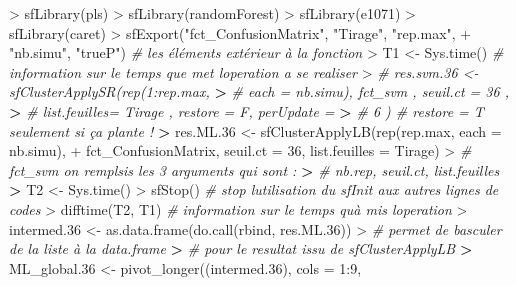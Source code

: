 \documentclass[
  11pt,
  french,
  a4paper,
  extrafontsizes,onecolumn,openright
  ]{memoir}
\newenvironment{Shaded}{\begin{snugshade}}{\end{snugshade}}
\newcommand{\AttributeTok}[1]{\textcolor[rgb]{0.77,0.63,0.00}{#1}}
\newcommand{\CommentTok}[1]{\textcolor[rgb]{0.56,0.35,0.01}{\textit{#1}}}
\newcommand{\DecValTok}[1]{\textcolor[rgb]{0.00,0.00,0.81}{#1}}
\newcommand{\ErrorTok}[1]{\textcolor[rgb]{0.64,0.00,0.00}{\textbf{#1}}}
\newcommand{\FloatTok}[1]{\textcolor[rgb]{0.00,0.00,0.81}{#1}}
\newcommand{\FunctionTok}[1]{\textcolor[rgb]{0.00,0.00,0.00}{#1}}
\newcommand{\NormalTok}[1]{#1}
\newcommand{\OtherTok}[1]{\textcolor[rgb]{0.56,0.35,0.01}{#1}}
\newcommand{\SpecialCharTok}[1]{\textcolor[rgb]{0.00,0.00,0.00}{#1}}
\newcommand{\StringTok}[1]{\textcolor[rgb]{0.31,0.60,0.02}{#1}}
\begin{document}
\begin{Shaded}
\begin{Highlighting}[]
\SpecialCharTok{\textgreater{}} \FunctionTok{sfLibrary}\NormalTok{(pls)}
\SpecialCharTok{\textgreater{}} \FunctionTok{sfLibrary}\NormalTok{(randomForest)}
\SpecialCharTok{\textgreater{}} \FunctionTok{sfLibrary}\NormalTok{(e1071)}
\SpecialCharTok{\textgreater{}} \FunctionTok{sfLibrary}\NormalTok{(caret)}
\SpecialCharTok{\textgreater{}} \FunctionTok{sfExport}\NormalTok{(}\StringTok{"fct\_ConfusionMatrix"}\NormalTok{, }\StringTok{"Tirage"}\NormalTok{, }\StringTok{"rep.max"}\NormalTok{, }
\SpecialCharTok{+}     \StringTok{"nb.simu"}\NormalTok{, }\StringTok{"trueP"}\NormalTok{)  }\CommentTok{\# les éléments extérieur à la fonction}
\SpecialCharTok{\textgreater{}}\NormalTok{ T1 }\OtherTok{\textless{}{-}} \FunctionTok{Sys.time}\NormalTok{()  }\CommentTok{\# information sur le temps que met l\textquotesingle{}operation a se realiser}
\SpecialCharTok{\textgreater{}} \CommentTok{\# res.svm.36 \textless{}{-} sfClusterApplySR(rep(1:rep.max,}
\ErrorTok{\textgreater{}} \CommentTok{\# each = nb.simu), fct\_svm , seuil.ct = 36 ,}
\ErrorTok{\textgreater{}} \CommentTok{\# list.feuilles= Tirage , restore = F, perUpdate =}
\ErrorTok{\textgreater{}} \CommentTok{\# 6 ) \# restore = T seulement si ça plante !}
\ErrorTok{\textgreater{}}\NormalTok{ res.ML}\FloatTok{.36} \OtherTok{\textless{}{-}} \FunctionTok{sfClusterApplyLB}\NormalTok{(}\FunctionTok{rep}\NormalTok{(rep.max, }\AttributeTok{each =}\NormalTok{ nb.simu), }
\SpecialCharTok{+}\NormalTok{     fct\_ConfusionMatrix, }\AttributeTok{seuil.ct =} \DecValTok{36}\NormalTok{, }\AttributeTok{list.feuilles =}\NormalTok{ Tirage)}
\SpecialCharTok{\textgreater{}} \CommentTok{\# fct\_svm on remplsis les 3 arguments qui sont :}
\ErrorTok{\textgreater{}} \CommentTok{\# nb.rep, seuil.ct, list.feuilles}
\ErrorTok{\textgreater{}}\NormalTok{ T2 }\OtherTok{\textless{}{-}} \FunctionTok{Sys.time}\NormalTok{()}
\SpecialCharTok{\textgreater{}} \FunctionTok{sfStop}\NormalTok{()  }\CommentTok{\# stop l\textquotesingle{}utilisation du sfInit aux autres lignes de codes}
\SpecialCharTok{\textgreater{}} \FunctionTok{difftime}\NormalTok{(T2, T1)  }\CommentTok{\# information sur le temps qu\textquotesingle{}à mis l\textquotesingle{}operation }
\SpecialCharTok{\textgreater{}}\NormalTok{ intermed}\FloatTok{.36} \OtherTok{\textless{}{-}} \FunctionTok{as.data.frame}\NormalTok{(}\FunctionTok{do.call}\NormalTok{(rbind, res.ML}\FloatTok{.36}\NormalTok{))}
\SpecialCharTok{\textgreater{}} \CommentTok{\# permet de basculer de la liste à la data.frame}
\ErrorTok{\textgreater{}} \CommentTok{\# pour le resultat issu de sfClusterApplyLB}
\ErrorTok{\textgreater{}}\NormalTok{ ML\_global}\FloatTok{.36} \OtherTok{\textless{}{-}} \FunctionTok{pivot\_longer}\NormalTok{((intermed}\FloatTok{.36}\NormalTok{), }\AttributeTok{cols =} \DecValTok{1}\SpecialCharTok{:}\DecValTok{9}\NormalTok{, }

\end{Highlighting}
\end{Shaded}
\end{document}
